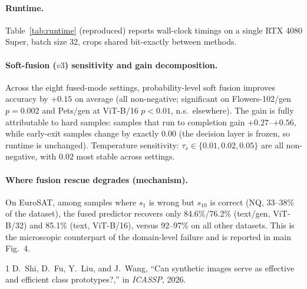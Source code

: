 \documentclass[10pt]{article}
\begin{document}
\paragraph{Runtime.}
Table~\ref{tab:runtime} (reproduced) reports wall-clock timings on a
single RTX 4080 Super, batch size 32, crops shared bit-exactly between
methods.



\paragraph{Soft-fusion ($v3$) sensitivity and gain decomposition.}
Across the eight fused-mode settings, probability-level soft fusion
improves accuracy by $+0.15$ on average (all non-negative; significant
on Flowers-102/gen $p{=}0.002$ and Pets/gen at ViT-B/16 $p{<}0.01$, n.s.\
elsewhere). The gain is fully attributable to hard samples: samples that
run to completion gain $+0.27$--$+0.56$, while early-exit samples change
by exactly $0.00$ (the decision layer is frozen, so runtime is unchanged).
Temperature sensitivity: $\tau_s \in \{0.01, 0.02, 0.05\}$ are all
non-negative, with $0.02$ most stable across settings.

\paragraph{Where fusion rescue degrades (mechanism).}
On EuroSAT, among samples where $s_1$ is wrong but $s_{10}$ is correct
(NQ, 33--38\% of the dataset), the fused predictor recovers only
84.6\%/76.2\% (text/gen, ViT-B/32) and 85.1\% (text, ViT-B/16), versus
92--97\% on all other datasets. This is the microscopic counterpart of
the domain-level failure and is reported in main Fig.~4.

\begin{thebibliography}{1}
 D.~Shi, D.~Fu, Y.~Liu, and J.~Wang, ``Can synthetic
images serve as effective and efficient class prototypes?,'' in \emph{ICASSP}, 2026.
\end{thebibliography}
\end{document}
